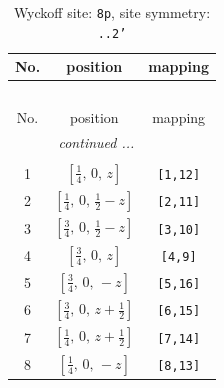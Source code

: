 \documentclass[fleqn,8pt]{jsarticle}
\begin{document}
\begin{longtable}{ccc}
\caption{Wyckoff site: {\tt 8p}, site symmetry: {\tt ..2'}}
 \\
 \hline \hline
No. & position & mapping \\ \hline \endfirsthead

\multicolumn{2}{l}{\tablename\ \thetable{}} \\
 \hline \hline
No. & position & mapping \\ \hline \endhead

 \hline \hline
\multicolumn{2}{r}{\footnotesize\it continued ...} \\ \endfoot

 \hline \hline
\multicolumn{2}{r}{} \\ \endlastfoot

1 & $\left[ \frac{1}{4},\, 0,\, z \right]$ & {\tt [1,12]} \\ \hline
2 & $\left[ \frac{1}{4},\, 0,\, \frac{1}{2} - z \right]$ & {\tt [2,11]} \\ \hline
3 & $\left[ \frac{3}{4},\, 0,\, \frac{1}{2} - z \right]$ & {\tt [3,10]} \\ \hline
4 & $\left[ \frac{3}{4},\, 0,\, z \right]$ & {\tt [4,9]} \\ \hline
5 & $\left[ \frac{3}{4},\, 0,\, - z \right]$ & {\tt [5,16]} \\ \hline
6 & $\left[ \frac{3}{4},\, 0,\, z + \frac{1}{2} \right]$ & {\tt [6,15]} \\ \hline
7 & $\left[ \frac{1}{4},\, 0,\, z + \frac{1}{2} \right]$ & {\tt [7,14]} \\ \hline
8 & $\left[ \frac{1}{4},\, 0,\, - z \right]$ & {\tt [8,13]} \\
\end{longtable}
\renewcommand{\arraystretch}{1.2}
\end{document}
